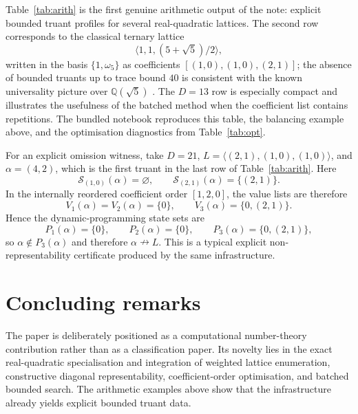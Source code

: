 \documentclass[manuscript]{acmart}
\theoremstyle{plain}
\theoremstyle{definition}
\theoremstyle{nonitalicremark}
\newcommand{\Q}{\mathbb{Q}}
\newcommand{\cS}{\mathcal{S}}
\begin{document}
Table~\ref{tab:arith} is the first genuine arithmetic output of the note: explicit bounded truant
profiles for several real-quadratic lattices. The second row corresponds to the classical ternary
lattice
\[
\langle 1,1,(5+\sqrt5)/2\rangle,
\]
written in the basis $\{1,\omega_5\}$ as coefficients $[(1,0),(1,0),(2,1)]$; the absence of bounded
truants up to trace bound $40$ is consistent with the known universality picture over $\Q(\sqrt5)$
\cite{KalaSurvey}. The \(D=13\) row is especially compact and illustrates the usefulness of the
batched method when the coefficient list contains repetitions. The bundled notebook reproduces this
table, the balancing example above, and the optimisation diagnostics from Table~\ref{tab:opt}.

For an explicit omission witness, take $D=21$, $L=\langle (2,1),(1,0),(1,0)\rangle$, and
$\alpha=(4,2)$, which is the first truant in the last row of Table~\ref{tab:arith}. Here
\[
\cS_{(1,0)}(\alpha)=\varnothing,
\qquad
\cS_{(2,1)}(\alpha)=\{(2,1)\}.
\]
In the internally reordered coefficient order $[1,2,0]$, the value lists are therefore
\[
V_1(\alpha)=V_2(\alpha)=\{0\},
\qquad
V_3(\alpha)=\{0,(2,1)\}.
\]
Hence the dynamic-programming state sets are
\[
P_1(\alpha)=\{0\},
\qquad
P_2(\alpha)=\{0\},
\qquad
P_3(\alpha)=\{0,(2,1)\},
\]
so $\alpha\notin P_3(\alpha)$ and therefore $\alpha\nrightarrow L$. This is a typical explicit
non-representability certificate produced by the same infrastructure.

\section{Concluding remarks}

The paper is deliberately positioned as a computational number-theory contribution rather than as a
classification paper. Its novelty lies in the exact real-quadratic specialisation and integration of
weighted lattice enumeration, constructive diagonal representability, coefficient-order optimisation,
and batched bounded search. The arithmetic examples above show that the infrastructure already yields
explicit bounded truant data.
\end{document}
